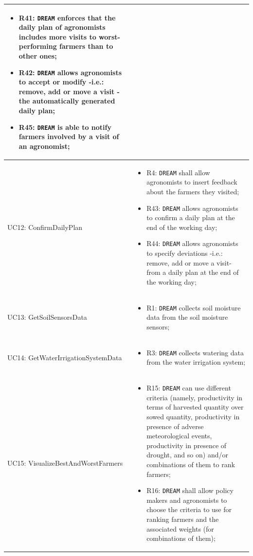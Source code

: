 \documentclass{article}
\begin{document}
\begin{longtable}[c]{|m{}|m{8cm}|}
\begin{itemize}
    \item R41: \verb|DREAM| enforces that the daily plan of agronomists includes more visits to worst-performing farmers than to other ones;

    \item R42: \verb|DREAM| allows agronomists to accept or modify -i.e.: remove, add or move a visit - the automatically generated daily plan;

    \item R45: \verb|DREAM| is able to notify farmers involved by a visit of an agronomist;
\end{itemize}\\ \hline
\hline
UC12: ConfirmDailyPlan & 
\begin{itemize}
    \item R4: \verb|DREAM| shall allow agronomists to insert feedback about the farmers they visited;
    
    \item R43: \verb|DREAM| allows agronomists to confirm a daily plan at the end of the working day; 

    \item R44: \verb|DREAM| allows agronomists to specify deviations -i.e.: remove, add or move a visit- from a daily plan at the end of the working day; 
\end{itemize}\\
\hline
UC13: GetSoilSensorsData & 
\begin{itemize}
    \item R1: \verb|DREAM| collects soil moisture data from the soil moisture sensors;
\end{itemize} \\ \hline
\hline
UC14: GetWaterIrrigationSystemData & 
\begin{itemize}
    \item R3: \verb|DREAM| collects watering data from the water irrigation system;
\end{itemize} \\ \hline
\hline
UC15: VisualizeBestAndWorstFarmers & 
\begin{itemize}
    \item R15: \verb|DREAM| can use different criteria (namely, productivity in terms of harvested quantity over sowed quantity, productivity in presence of adverse meteorological events, productivity in presence of drought, and so on) and/or combinations of them to rank farmers;
    
    \item R16: \verb|DREAM| shall allow policy makers and agronomists to choose the criteria to use for ranking farmers and the associated weights (for combinations of them);
    

\end{itemize}
\end{longtable}
\end{document}
